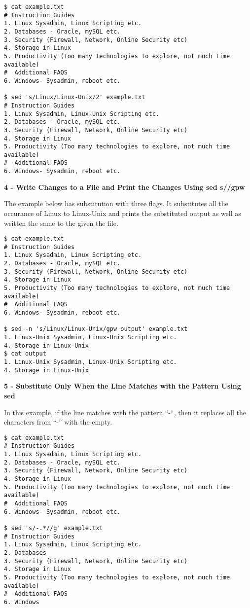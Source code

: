 \documentclass[a4paper,11pt,spanish]{article} %
\newenvironment{myscriptlisting}
{\begin{list}{}{\setlength{\leftmargin}{1em}}\item\scriptsize\bfseries}
{\end{list}}
\begin{document}
\begin{myscriptlisting}
 \begin{verbatim}
$ cat example.txt
# Instruction Guides
1. Linux Sysadmin, Linux Scripting etc.
2. Databases - Oracle, mySQL etc.
3. Security (Firewall, Network, Online Security etc)
4. Storage in Linux
5. Productivity (Too many technologies to explore, not much time available)
#  Additional FAQS
6. Windows- Sysadmin, reboot etc.

$ sed 's/Linux/Linux-Unix/2' example.txt
# Instruction Guides
1. Linux Sysadmin, Linux-Unix Scripting etc.
2. Databases - Oracle, mySQL etc.
3. Security (Firewall, Network, Online Security etc)
4. Storage in Linux
5. Productivity (Too many technologies to explore, not much time available)
#  Additional FAQS
6. Windows- Sysadmin, reboot etc.
 \end{verbatim}
\end{myscriptlisting}

\textbf{4 - Write Changes to a File and Print the Changes Using sed s//gpw}

The example below has substitution with three flags. It substitutes all the
occurance of Linux to Linux-Unix and prints the substituted output as well as
written the same to the given the file.

\begin{myscriptlisting}
 \begin{verbatim}
$ cat example.txt
# Instruction Guides
1. Linux Sysadmin, Linux Scripting etc.
2. Databases - Oracle, mySQL etc.
3. Security (Firewall, Network, Online Security etc)
4. Storage in Linux
5. Productivity (Too many technologies to explore, not much time available)
#  Additional FAQS
6. Windows- Sysadmin, reboot etc.

$ sed -n 's/Linux/Linux-Unix/gpw output' example.txt
1. Linux-Unix Sysadmin, Linux-Unix Scripting etc.
4. Storage in Linux-Unix
$ cat output
1. Linux-Unix Sysadmin, Linux-Unix Scripting etc.
4. Storage in Linux-Unix
 \end{verbatim}
\end{myscriptlisting}

\textbf{5 - Substitute Only When the Line Matches with the Pattern Using sed}

In this example, if the line matches with the pattern “-“, then it replaces 
all the characters from “-” with the empty.

\begin{myscriptlisting}
 \begin{verbatim}
$ cat example.txt
# Instruction Guides
1. Linux Sysadmin, Linux Scripting etc.
2. Databases - Oracle, mySQL etc.
3. Security (Firewall, Network, Online Security etc)
4. Storage in Linux
5. Productivity (Too many technologies to explore, not much time available)
#  Additional FAQS
6. Windows- Sysadmin, reboot etc.

$ sed 's/-.*//g' example.txt
# Instruction Guides
1. Linux Sysadmin, Linux Scripting etc.
2. Databases
3. Security (Firewall, Network, Online Security etc)
4. Storage in Linux
5. Productivity (Too many technologies to explore, not much time available)
#  Additional FAQS
6. Windows
 \end{verbatim}
\end{myscriptlisting}
\end{document}
